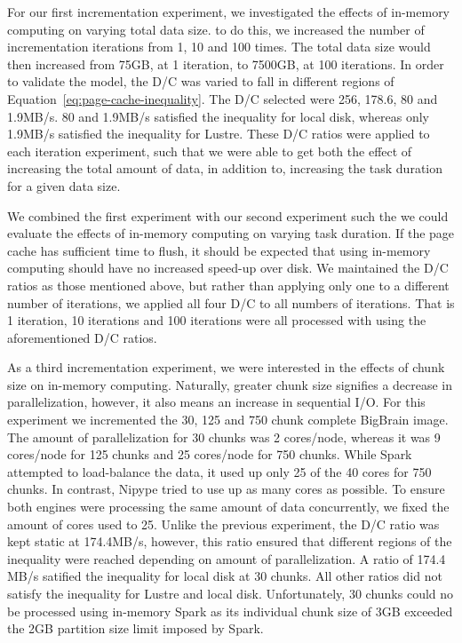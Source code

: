 \documentclass{IEEEtran}
\newcommand{\todo}[1]{\marginpar{\parbox{18mm}{\flushleft\tiny\color{red}\textbf{TODO}:
      #1}}}
\begin{document}
For our first incrementation experiment, we investigated the effects of
in-memory computing on varying total data size. to do this, we increased the 
number of incrementation iterations from 1, 10 and 100 times. The total data 
size would then increased from 75GB, at 1 iteration, to 7500GB, at 100 
iterations. In order
to validate the model, the D/C was varied to fall in different regions of 
Equation~\ref{eq:page-cache-inequality}. The D/C selected were 256, 178.6, 80 
and 1.9MB/s\todo{present this as a table?}. 80 and 1.9MB/s satisfied the 
inequality for local disk, whereas only 1.9MB/s satisfied the inequality for 
Lustre. These D/C ratios were applied to each iteration experiment, such that 
we were able to get both the effect of increasing the total amount of data, in 
addition to, increasing the task duration for a given data size.

We combined the first experiment with our second experiment such the we could 
evaluate the effects of in-memory computing on varying task duration. If the 
page cache has sufficient time to flush, it should be expected that using 
in-memory computing should have no increased speed-up over disk. We maintained 
the D/C ratios as those mentioned above, but rather than applying only one to
a different number of iterations, we applied all four D/C to all numbers of 
iterations. That is 1 iteration, 10 iterations and 100 iterations were all 
processed with using the aforementioned D/C ratios.

As a third incrementation experiment, we were interested in the effects of 
chunk size on in-memory computing. Naturally, greater chunk size signifies 
a decrease in parallelization, however, it also means an increase in sequential
I/O. For this experiment we incremented the 30, 125 and 750 chunk complete
BigBrain image. The amount of parallelization for 30 chunks was 2 cores/node, 
whereas it was 9 cores/node for 125 chunks and 25 cores/node for 750 chunks. 
While Spark attempted to load-balance the data, it used up only 25 of the 40 
cores for 750 chunks. In contrast, Nipype tried to use up as many cores as 
possible. To ensure both engines were processing the same amount of data 
concurrently, we fixed the amount of cores used to 25.
Unlike the previous experiment, the D/C ratio was kept static at 174.4MB/s, 
however, this ratio ensured that different regions of the inequality were 
reached depending on amount of parallelization. A ratio of 174.4 MB/s satified
the inequality for local disk at 30 chunks. All other ratios did not satisfy 
the inequality for Lustre and local disk. Unfortunately, 30 chunks could no be 
processed using in-memory Spark as its individual chunk size of 3GB exceeded 
the 2GB partition size limit imposed by Spark.
\end{document}
